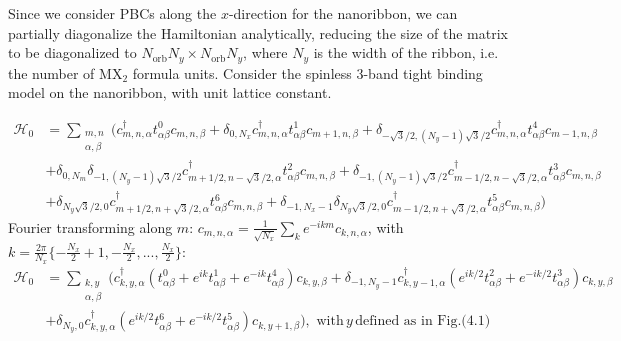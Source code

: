 Since we consider PBCs along the $x$-direction for the nanoribbon, we can partially diagonalize the Hamiltonian analytically, reducing the size of the matrix to be diagonalized to $N_{\text{orb}} N_y \times N_{\text{orb}} N_y$, where $N_y$ is the width of the ribbon, i.e. the number of $\text{M}\text{X}_2$ formula units.
Consider the spinless 3-band tight binding model on the nanoribbon, with unit lattice constant.
\begin{strip}
\vspace{-1.1cm}
\begin{equation}
\begin{split}
\mathcal{H}_0 &= \sum_{\substack{m, n \\ \alpha, \beta}} \bigg( c_{m,n, \alpha}^\dagger t_{\alpha\beta}^0 c_{m, n, \beta} + \delta_{0, N_x}  c_{m,n, \alpha}^\dagger t_{\alpha\beta}^1 c_{m+1, n, \beta} + \delta_{-\sqrt{3}/2, (N_y -1)\sqrt{3}/2}  c_{m,n, \alpha}^\dagger t_{\alpha\beta}^4 c_{m-1, n, \beta} \\
& + \delta_{0, N_m} \delta_{-1, (N_y -1)\sqrt{3}/2} c_{m+1/2,n-\sqrt{3}/2, \alpha}^\dagger t_{\alpha\beta}^2 c_{m, n, \beta} + \delta_{-1, (N_y -1)\sqrt{3}/2} c_{m-1/2,n-\sqrt{3}/2, \alpha}^\dagger t_{\alpha\beta}^3 c_{m, n, \beta} \\
& + \delta_{N_y\sqrt{3}/2, 0} c_{m+1/2,n+\sqrt{3}/2, \alpha}^\dagger t_{\alpha\beta}^6 c_{m, n, \beta} + \delta_{-1, N_x -1} \delta_{N_y\sqrt{3}/2, 0} c_{m-1/2,n+\sqrt{3}/2, \alpha}^\dagger t_{\alpha\beta}^5 c_{m, n, \beta} \bigg)
\end{split}
\end{equation}
Fourier transforming along $m$: $c_{m, n, \alpha} = \frac{1}{\sqrt{N_x}}\sum_{k} e^{-i k m } c_{k, n, \alpha} $, with $k = \frac{2\pi}{N_x} \{ -\frac{N_x}{2} + 1, -\frac{N_x}{2}, ..., \frac{N_x}{2} \}$:
\begin{equation}
\begin{split}
\mathcal{H}_0 &= \sum_{ \substack{k, y \\ \alpha, \beta} } \bigg( c_{k, y, \alpha}^\dagger (t_{\alpha \beta}^0  + e^{ik} t_{\alpha \beta}^1 + e^{-ik} t_{\alpha \beta}^4 )  c_{k, y, \beta} + \delta_{-1, N_y -1} c_{k, y - 1, \alpha}^\dagger ( e^{ik/2} t_{\alpha \beta}^2 + e^{-ik/2} t_{\alpha \beta}^3 ) c_{k, y, \beta} \\
& + \delta_{N_y, 0} c_{k, y, \alpha}^\dagger ( e^{ik/2} t_{\alpha \beta}^6 + e^{-ik/2} t_{\alpha \beta}^5 ) c_{k, y+1, \beta} \bigg) , \,\, \text{with} \, y \, \text{defined as in Fig.(4.1)}
\end{split}
\end{equation}

\end{strip}
